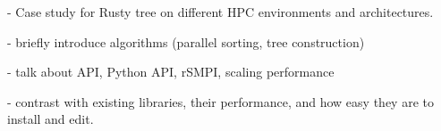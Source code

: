 - Case study for Rusty tree on different HPC environments and architectures. 

- briefly introduce algorithms (parallel sorting, tree construction)

- talk about API, Python API, rSMPI, scaling performance

- contrast with existing libraries, their performance, and how easy they are to install and edit.
